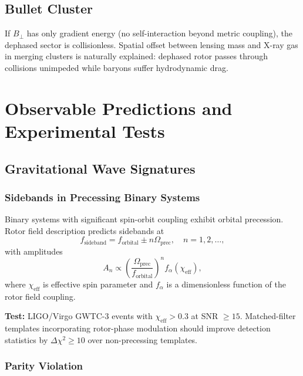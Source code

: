 \documentclass[11pt,a4paper]{article}
\numberwithin{equation}{section}
\theoremstyle{plain}
\theoremstyle{definition}
\theoremstyle{remark}
\begin{document}
\subsection{Bullet Cluster}

If $B_\perp$ has only gradient energy (no self-interaction beyond metric coupling), the dephased sector is collisionless. Spatial offset between lensing mass and X-ray gas in merging clusters is naturally explained: dephased rotor passes through collisions unimpeded while baryons suffer hydrodynamic drag.

\section{Observable Predictions and Experimental Tests}
\label{sec:predictions}

\subsection{Gravitational Wave Signatures}

\subsubsection{Sidebands in Precessing Binary Systems}

Binary systems with significant spin-orbit coupling exhibit orbital precession. Rotor field description predicts sidebands at
\begin{equation}
f_{\mathrm{sideband}} = f_{\mathrm{orbital}} \pm n\Omega_{\mathrm{prec}}, \quad n = 1,2,\ldots,
\label{eq:gw-sidebands}
\end{equation}
with amplitudes
\begin{equation}
A_n \propto \left(\frac{\Omega_{\mathrm{prec}}}{f_{\mathrm{orbital}}}\right)^n f_{\alpha}(\chi_{\mathrm{eff}}),
\end{equation}
where $\chi_{\mathrm{eff}}$ is effective spin parameter and $f_{\alpha}$ is a dimensionless function of the rotor field coupling.

\textbf{Test:} LIGO/Virgo GWTC-3 events with $\chi_{\mathrm{eff}} > 0.3$ at SNR $\geq 15$. Matched-filter templates incorporating rotor-phase modulation should improve detection statistics by $\Delta\chi^2 \geq 10$ over non-precessing templates.

\subsubsection{Parity Violation}
\end{document}
